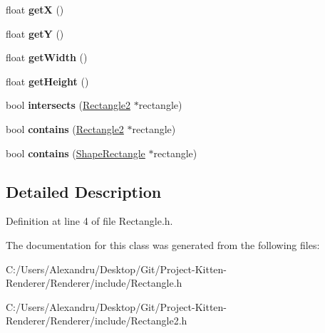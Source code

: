 \begin{DoxyCompactItemize}
\item 
\hypertarget{class_rectangle2_a77ea347dfadc86026cd4cbc22961282a}{}float {\bfseries get\+X} ()\label{class_rectangle2_a77ea347dfadc86026cd4cbc22961282a}

\item 
\hypertarget{class_rectangle2_abacea2a11c1f14c36518558725f1f576}{}float {\bfseries get\+Y} ()\label{class_rectangle2_abacea2a11c1f14c36518558725f1f576}

\item 
\hypertarget{class_rectangle2_a70d3c3ca01f1517d4050e454e1cf0407}{}float {\bfseries get\+Width} ()\label{class_rectangle2_a70d3c3ca01f1517d4050e454e1cf0407}

\item 
\hypertarget{class_rectangle2_a04202feecc664c1d260002e6bc211f96}{}float {\bfseries get\+Height} ()\label{class_rectangle2_a04202feecc664c1d260002e6bc211f96}

\item 
\hypertarget{class_rectangle2_a42a1a94338f206ff4b1d3709763c954d}{}bool {\bfseries intersects} (\hyperlink{class_rectangle2}{Rectangle2} $\ast$rectangle)\label{class_rectangle2_a42a1a94338f206ff4b1d3709763c954d}

\item 
\hypertarget{class_rectangle2_a905b7f047177d2374a9a1742ba646a2b}{}bool {\bfseries contains} (\hyperlink{class_rectangle2}{Rectangle2} $\ast$rectangle)\label{class_rectangle2_a905b7f047177d2374a9a1742ba646a2b}

\item 
\hypertarget{class_rectangle2_a936a5b369d38bfb65387375266515c76}{}bool {\bfseries contains} (\hyperlink{class_shape_rectangle}{Shape\+Rectangle} $\ast$rectangle)\label{class_rectangle2_a936a5b369d38bfb65387375266515c76}

\end{DoxyCompactItemize}


\subsection{Detailed Description}


Definition at line 4 of file Rectangle.\+h.



The documentation for this class was generated from the following files\+:\begin{DoxyCompactItemize}
\item 
C\+:/\+Users/\+Alexandru/\+Desktop/\+Git/\+Project-\/\+Kitten-\/\+Renderer/\+Renderer/include/Rectangle.\+h\item 
C\+:/\+Users/\+Alexandru/\+Desktop/\+Git/\+Project-\/\+Kitten-\/\+Renderer/\+Renderer/include/Rectangle2.\+h\end{DoxyCompactItemize}
